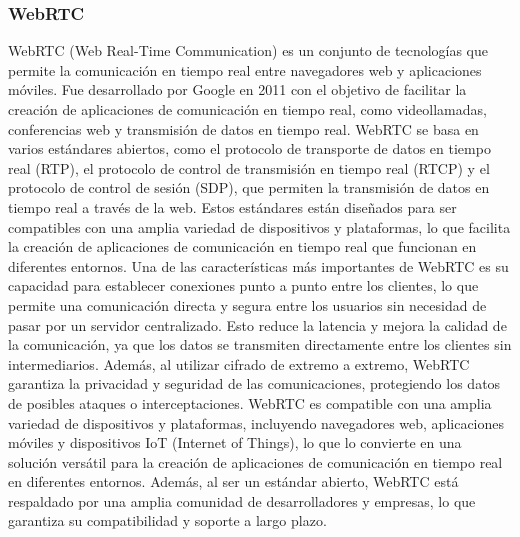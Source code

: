 \subsubsection{WebRTC} %
\label{ssub:WebRTC}

    WebRTC (Web Real-Time Communication) es un conjunto de tecnolog\'ias que permite la comunicaci\'on en tiempo real entre navegadores web 
        y aplicaciones m\'oviles. Fue desarrollado por Google en 2011 con el objetivo de facilitar la creaci\'on de aplicaciones de 
        comunicaci\'on en tiempo real, como videollamadas, conferencias web y transmisi\'on de datos en tiempo real. \cite{WebRTC}
    \vskip 0.5cm
        WebRTC se basa en varios est\'andares abiertos, como el protocolo de transporte de datos en tiempo real (RTP), el protocolo de 
            control de transmisi\'on en tiempo real (RTCP) y el protocolo de control de sesi\'on (SDP), que permiten la transmisi\'on 
            de datos en tiempo real a trav\'es de la web. Estos est\'andares est\'an dise\~nados para ser compatibles con una amplia 
            variedad de dispositivos y plataformas, lo que facilita la creaci\'on de aplicaciones de comunicaci\'on en tiempo real 
            que funcionan en diferentes entornos. \cite{WebRTC}
    \vskip 0.5cm
        Una de las caracter\'isticas m\'as importantes de WebRTC es su capacidad para establecer conexiones punto a punto entre 
            los clientes, lo que permite una comunicaci\'on directa y segura entre los usuarios sin necesidad de pasar por un 
            servidor centralizado. Esto reduce la latencia y mejora la calidad de la comunicaci\'on, ya que los datos se transmiten 
            directamente entre los clientes sin intermediarios. Adem\'as, al utilizar cifrado de extremo a extremo, WebRTC garantiza 
            la privacidad y seguridad de las comunicaciones, protegiendo los datos de posibles ataques o interceptaciones. \cite{WebRTC}
    \vskip 0.5cm
        WebRTC es compatible con una amplia variedad de dispositivos y plataformas, incluyendo navegadores web, aplicaciones m\'oviles 
            y dispositivos IoT (Internet of Things), lo que lo convierte en una soluci\'on vers\'atil para la creaci\'on de aplicaciones 
            de comunicaci\'on en tiempo real en diferentes entornos. Adem\'as, al ser un est\'andar abierto, WebRTC est\'a respaldado por 
            una amplia comunidad de desarrolladores y empresas, lo que garantiza su compatibilidad y soporte a largo plazo. \cite{WebRTC}

